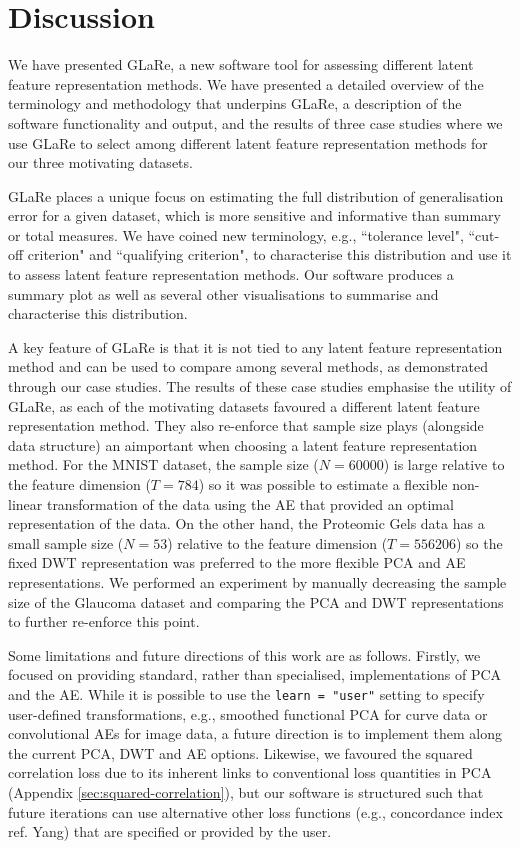 \section{Discussion}\label{sec:discussion}

We have presented GLaRe, a new software tool for assessing different latent feature representation methods.
We have presented a detailed overview of the terminology and methodology that underpins GLaRe, a description of the software functionality and output, and the results of three case studies where we use GLaRe to select among different latent feature representation methods for our three motivating datasets.

GLaRe places a unique focus on estimating the full distribution of generalisation error for a given dataset, which is more sensitive and informative than summary or total measures.
We have coined new terminology, e.g., ``tolerance level", ``cut-off criterion" and ``qualifying criterion", to characterise this distribution and use it to assess latent feature representation methods.
Our software produces a summary plot as well as several other visualisations to summarise and characterise this distribution.

A key feature of GLaRe is that it is not tied to any latent feature representation method and can be used to compare among several methods, as demonstrated through our case studies.
The results of these case studies emphasise the utility of GLaRe, as each of the motivating datasets favoured a different latent feature representation method.
They also re-enforce that sample size plays (alongside data structure) an aimportant when choosing a latent feature representation method.
For the MNIST dataset, the sample size ($N=60000$) is large relative to the feature dimension ($T=784$) so it was possible to estimate a flexible non-linear transformation of the data using the AE that provided an optimal representation of the data.
On the other hand, the Proteomic Gels data has a small sample size ($N=53$) relative to the feature dimension ($T=556206$) so the fixed DWT representation was preferred to the more flexible PCA and AE representations.
We performed an experiment by manually decreasing the sample size of the Glaucoma dataset and comparing the PCA and DWT representations to further re-enforce this point.

Some limitations and future directions of this work are as follows.
Firstly, we focused on providing standard, rather than specialised, implementations of PCA and the AE.
While it is possible to use the \texttt{learn = "user"} setting to specify user-defined transformations, e.g., smoothed functional PCA for curve data or convolutional AEs for image data, a future direction is to implement them along the current PCA, DWT and AE options.
Likewise, we favoured the squared correlation loss due to its inherent links to conventional loss quantities in PCA (Appendix \ref{sec:squared-correlation}), but our software is structured such that future iterations can use alternative other loss functions (e.g., concordance index {\color{red}ref. Yang}) that are specified or provided by the user.







